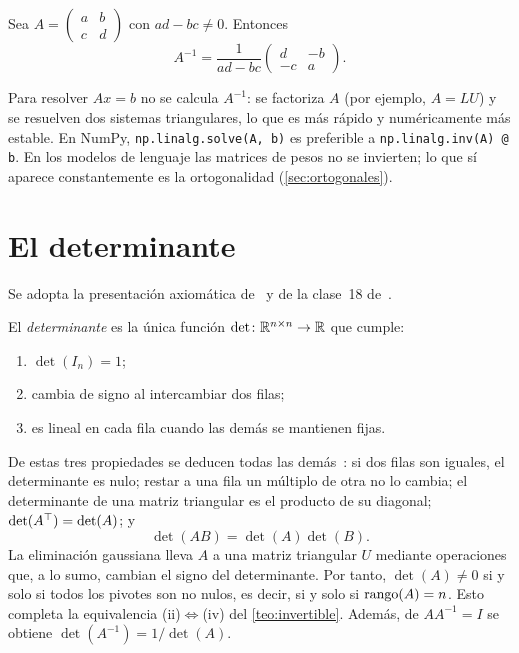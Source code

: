 \begin{proposicion}\label{prop:inversa2}
Sea $A=\begin{pmatrix}a&b\\c&d\end{pmatrix}$ con $ad-bc\ne 0$. Entonces
\[
A^{-1}=\frac{1}{ad-bc}\begin{pmatrix}d&-b\\-c&a\end{pmatrix}.
\]
\end{proposicion}

\addtocounter{definicion}{1}%

\begin{observacion}
Para resolver $Ax=b$ no se calcula $A^{-1}$: se factoriza $A$ (por ejemplo, $A=LU$) y se resuelven dos sistemas triangulares, lo que es más rápido y numéricamente más estable. En NumPy, \texttt{np.linalg.solve(A, b)} es preferible a \texttt{np.linalg.inv(A) @ b}. En los modelos de lenguaje las matrices de pesos no se invierten; lo que sí aparece constantemente es la ortogonalidad (\cref{sec:ortogonales}).
\end{observacion}

\section{El determinante}\label{sec:determinante}

Se adopta la presentación axiomática de~\cite[§5.1]{strang-ila} y de la clase~18 de~\cite{mit1806}.

\begin{definicion}[Determinante]\label{def:det}
El \emph{determinante} es la única función $\det\colon\mathbb{R}^{n\times n}\to\mathbb{R}$ que cumple:
\begin{enumerate}
  \item $\det(I_n)=1$;
  \item cambia de signo al intercambiar dos filas;
  \item es lineal en cada fila cuando las demás se mantienen fijas.
\end{enumerate}
\end{definicion}

De estas tres propiedades se deducen todas las demás~\cite[§5.1]{strang-ila}: si dos filas son iguales, el determinante es nulo; restar a una fila un múltiplo de otra no lo cambia; el determinante de una matriz triangular es el producto de su diagonal; $\det(A^{\top})=\det(A)$; y
\[
\det(AB)=\det(A)\det(B).
\]
La eliminación gaussiana lleva $A$ a una matriz triangular $U$ mediante operaciones que, a lo sumo, cambian el signo del determinante. Por tanto, $\det(A)\ne 0$ si y solo si todos los pivotes son no nulos, es decir, si y solo si $\operatorname{rango}(A)=n$. Esto completa la equivalencia (ii)$\Leftrightarrow$(iv) del \cref{teo:invertible}. Además, de $AA^{-1}=I$ se obtiene $\det(A^{-1})=1/\det(A)$.

